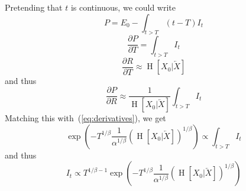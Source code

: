 \documentclass[11pt,letterpaper]{article}
\begin{document}
Pretending that $t$ is continuous, we could write
\begin{equation}
	P =	E_0 - \int_{t > T} (t-T) I_t
\end{equation}
\begin{equation}
	\frac{\partial P}{\partial T} =	\int_{t > T} I_t
\end{equation}
\begin{equation}
	\frac{\partial R}{\partial T} \approx \operatorname{H}[X_0|\overleftarrow{X}]
\end{equation}
and thus
\begin{equation}
	\frac{\partial P}{\partial R} \approx	\frac{1}{\operatorname{H}[X_0|\overleftarrow{X}]} \int_{t > T} I_t
\end{equation}
Matching this with~(\ref{eq:derivatives}), we get
\begin{equation}
	\exp\left(-T^{1/\beta} \frac{1}{\alpha^{1/\beta}} (\operatorname{H}[X_0|\overleftarrow{X}])^{1/\beta}\right) \propto \int_{t > T} I_t
\end{equation}
and thus
\begin{equation}
I_t \propto T^{1/\beta-1}	\exp\left(-T^{1/\beta} \frac{1}{\alpha^{1/\beta}} (\operatorname{H}[X_0|\overleftarrow{X}])^{1/\beta}\right)
\end{equation}




%
%
\end{document}
